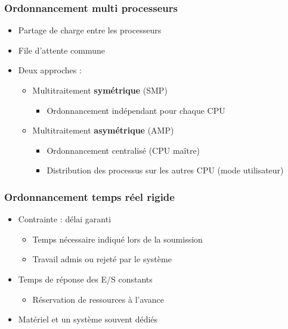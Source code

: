 \begin{frame}
 \frametitle{Ordonnancement multi processeurs}
 \begin{itemize}
  \item Partage de charge entre les processeurs 
  \item File d’attente commune
  \item Deux approches :
  \begin{itemize}
   \item Multitraitement \textbf{symétrique} (SMP)
   \begin{itemize}
    \item Ordonnancement indépendant pour chaque CPU
   \end{itemize}
   \item Multitraitement \textbf{asymétrique} (AMP)
   \begin{itemize}
    \item Ordonnancement centralisé (CPU maître)
    \item Distribution des processus sur les autres CPU (mode utilisateur)
   \end{itemize}
  \end{itemize}
 \end{itemize}
\end{frame}


\begin{frame}
 \frametitle{Ordonnancement temps réel rigide}
 \begin{itemize}
 \item Contrainte : délai garanti
 \begin{itemize}
 \item Temps nécessaire indiqué lors de la soumission
 \item Travail admis ou rejeté par le système
 \end{itemize}
 \item Temps de réponse des E/S constants
 \begin{itemize}
 \item Réservation de ressources à l'avance
 \end{itemize}
 \item Matériel et un système souvent dédiés
 \end{itemize}
\end{frame}

